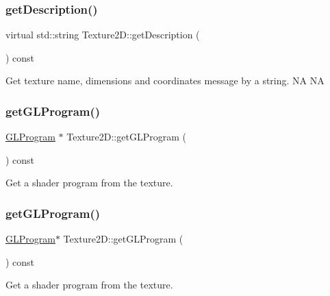 \subsubsection{\texorpdfstring{get\+Description()}{getDescription()}\hspace{0.1cm}{\footnotesize\ttfamily [2/2]}}
{\footnotesize\ttfamily virtual std\+::string Texture2\+D\+::get\+Description (\begin{DoxyParamCaption}{ }\end{DoxyParamCaption}) const\hspace{0.3cm}{\ttfamily [virtual]}}

Get texture name, dimensions and coordinates message by a string.  NA  NA \mbox{\label{classTexture2D_ae61deb7557336bc34a563d12e7a1c315}} 
\subsubsection{\texorpdfstring{get\+G\+L\+Program()}{getGLProgram()}\hspace{0.1cm}{\footnotesize\ttfamily [1/2]}}
{\footnotesize\ttfamily \hyperlink{classGLProgram}{G\+L\+Program} $\ast$ Texture2\+D\+::get\+G\+L\+Program (\begin{DoxyParamCaption}{ }\end{DoxyParamCaption}) const}

Get a shader program from the texture. \mbox{\label{classTexture2D_ad1f4b0143dc648e4d41ee5e1969b96ea}} 
\subsubsection{\texorpdfstring{get\+G\+L\+Program()}{getGLProgram()}\hspace{0.1cm}{\footnotesize\ttfamily [2/2]}}
{\footnotesize\ttfamily \hyperlink{classGLProgram}{G\+L\+Program}$\ast$ Texture2\+D\+::get\+G\+L\+Program (\begin{DoxyParamCaption}{ }\end{DoxyParamCaption}) const}

Get a shader program from the texture. \mbox{\label{classTexture2D_ac5d32187817ecac6e541ab5d41900b16}} 
